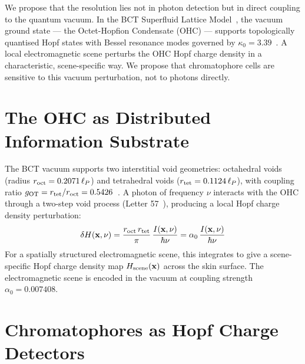 \documentclass[twocolumn,10pt]{article}
\begin{document}
We propose that the resolution lies not in photon detection but in direct coupling to
the quantum vacuum. In the BCT Superfluid Lattice Model~\cite{bct_l1}, the vacuum ground
state --- the Octet-Hopfion Condensate (OHC) --- supports topologically quantised Hopf
states with Bessel resonance modes governed by $\kappa_0 = 3.39$~\cite{bct_jhapp}. A
local electromagnetic scene perturbs the OHC Hopf charge density in a characteristic,
scene-specific way. We propose that chromatophore cells are sensitive to this vacuum
perturbation, not to photons directly.

\section{The OHC as Distributed Information Substrate}

The BCT vacuum supports two interstitial void geometries: octahedral voids (radius
$r_{\rm oct} = 0.2071\,\ell_P$) and tetrahedral voids ($r_{\rm tet} = 0.1124\,\ell_P$),
with coupling ratio $g_{\rm OT} = r_{\rm tet}/r_{\rm oct} = 0.5426$~\cite{bct_l1}.
A photon of frequency $\nu$ interacts with the OHC through a two-step void process
(Letter 57~\cite{bct_l57}), producing a local Hopf charge density perturbation:
%
\begin{equation}
\delta H(\mathbf{x}, \nu) = \frac{r_{\rm oct}\,r_{\rm tet}}{\pi}\,
\frac{I(\mathbf{x},\nu)}{\hbar\nu} = \alpha_0\,\frac{I(\mathbf{x},\nu)}{\hbar\nu}
\end{equation}
%
For a spatially structured electromagnetic scene, this integrates to give a
scene-specific Hopf charge density map $H_{\rm scene}(\mathbf{x})$ across the skin
surface. The electromagnetic scene is encoded in the vacuum at coupling strength
$\alpha_0 = 0.007408$.

\section{Chromatophores as Hopf Charge Detectors}
\end{document}
